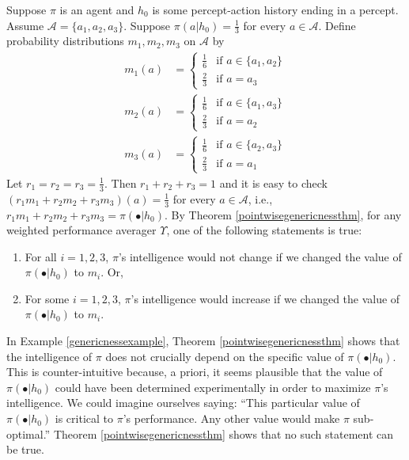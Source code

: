 \documentclass[runningheads]{llncs}
\begin{document}
\begin{example}
\label{genericnessexample}
    Suppose $\pi$ is an agent and $h_0$ is some percept-action history ending in a
    percept. Assume $\mathcal A=\{a_1,a_2,a_3\}$.
    Suppose $\pi(a|h_0)=\frac13$ for every $a\in\mathcal A$.
    Define probability distributions $m_1,m_2,m_3$ on $\mathcal A$ by
    \begin{align*}
        m_1(a) &=
        \begin{cases}
            \frac16 &\mbox{if $a\in\{a_1,a_2\}$}\\
            \frac23 &\mbox{if $a=a_3$}
        \end{cases}\\
        m_2(a) &=
        \begin{cases}
            \frac16 &\mbox{if $a\in\{a_1,a_3\}$}\\
            \frac23 &\mbox{if $a=a_2$}
        \end{cases}\\
        m_3(a) &=
        \begin{cases}
            \frac16 &\mbox{if $a\in\{a_2,a_3\}$}\\
            \frac23 &\mbox{if $a=a_1$}
        \end{cases}
    \end{align*}
    Let $r_1=r_2=r_3=\frac13$. Then $r_1+r_2+r_3=1$ and
    it is easy to check
    $(r_1m_1+r_2m_2+r_3m_3)(a)=\frac13$ for every $a\in\mathcal A$,
    i.e., $r_1m_1+r_2m_2+r_3m_3=\pi(\bullet|h_0)$.
    By Theorem \ref{pointwisegenericnessthm},
    for any weighted performance averager $\Upsilon$,
    one of the following statements is true:
    \begin{enumerate}
        \item
        For all $i=1,2,3$, $\pi$'s intelligence would not change if we
        changed the value of $\pi(\bullet|h_0)$ to $m_i$. Or,
        \item
        For some $i=1,2,3$, $\pi$'s intelligence would increase if
        we changed the value of $\pi(\bullet|h_0)$ to $m_i$.
    \end{enumerate}
\end{example}

In Example \ref{genericnessexample}, Theorem \ref{pointwisegenericnessthm} shows
that the intelligence of $\pi$ does not crucially depend on the specific value
of $\pi(\bullet|h_0)$. This is counter-intuitive because, a priori, it seems
plausible that the value of $\pi(\bullet|h_0)$ could have been determined
experimentally in order to maximize $\pi$'s intelligence. We could imagine ourselves
saying: ``This particular value of $\pi(\bullet|h_0)$ is critical to $\pi$'s
performance. Any other value would make $\pi$ sub-optimal.''
Theorem \ref{pointwisegenericnessthm} shows that no such statement can be true.



\end{document}
